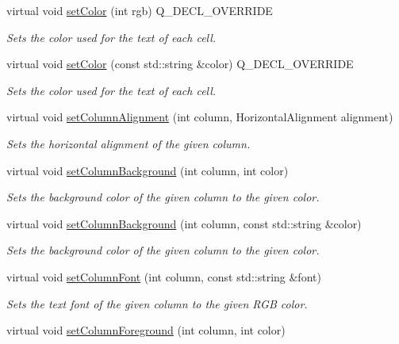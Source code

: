 \begin{DoxyCompactItemize}
virtual void \mbox{\hyperlink{classGTable_afd1f50a2c4695c79b8633d860bce5398}{set\+Color}} (int rgb) Q\+\_\+\+D\+E\+C\+L\+\_\+\+O\+V\+E\+R\+R\+I\+DE
\begin{DoxyCompactList}\small\item\em Sets the color used for the text of each cell. \end{DoxyCompactList}\item 
virtual void \mbox{\hyperlink{classGTable_ad148324da1b0340e84e24dffa577ffca}{set\+Color}} (const std\+::string \&color) Q\+\_\+\+D\+E\+C\+L\+\_\+\+O\+V\+E\+R\+R\+I\+DE
\begin{DoxyCompactList}\small\item\em Sets the color used for the text of each cell. \end{DoxyCompactList}\item 
virtual void \mbox{\hyperlink{classGTable_a84b3f42bb5d010483b78b9fd7e9c55f0}{set\+Column\+Alignment}} (int column, Horizontal\+Alignment alignment)
\begin{DoxyCompactList}\small\item\em Sets the horizontal alignment of the given column. \end{DoxyCompactList}\item 
virtual void \mbox{\hyperlink{classGTable_a48898e733d8ae3e285ff84d02e2cdee5}{set\+Column\+Background}} (int column, int color)
\begin{DoxyCompactList}\small\item\em Sets the background color of the given column to the given color. \end{DoxyCompactList}\item 
virtual void \mbox{\hyperlink{classGTable_a37fd3b921a5fba28b84dd4dd17fa9930}{set\+Column\+Background}} (int column, const std\+::string \&color)
\begin{DoxyCompactList}\small\item\em Sets the background color of the given column to the given color. \end{DoxyCompactList}\item 
virtual void \mbox{\hyperlink{classGTable_a0294ee7cb1af024bc77371f27d877164}{set\+Column\+Font}} (int column, const std\+::string \&font)
\begin{DoxyCompactList}\small\item\em Sets the text font of the given column to the given R\+GB color. \end{DoxyCompactList}\item 
virtual void \mbox{\hyperlink{classGTable_aa616c02b04beb6ca757dec04f46814b0}{set\+Column\+Foreground}} (int column, int color)

\end{DoxyCompactItemize}

